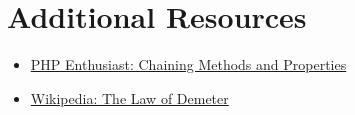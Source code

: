 \section{Additional Resources}

\begin{itemize}[leftmargin=*]
    \item \href{ https://phpenthusiast.com/object-oriented-php-tutorials/chaining-methods-and-properties}{PHP Enthusiast: Chaining Methods and Properties}
    \item \href{https://en.wikipedia.org/wiki/Law_of_Demeter}{Wikipedia: The Law of Demeter}
\end{itemize}
